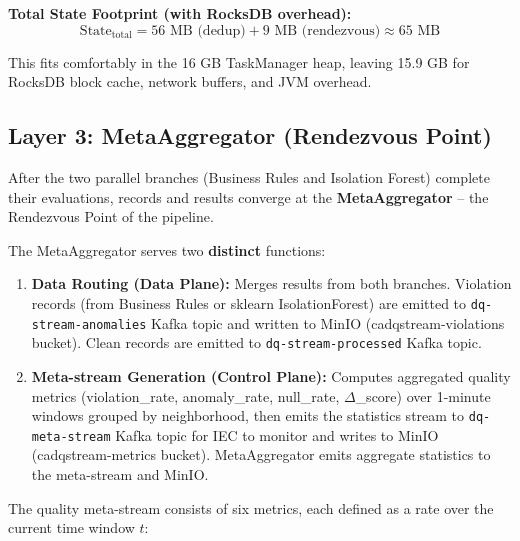 \textbf{Total State Footprint (with RocksDB overhead):}
\begin{equation}
\text{State}_{\text{total}} = 56 \text{ MB (dedup)} + 9 \text{ MB (rendezvous)} \approx 65 \text{ MB}
\end{equation}

This fits comfortably in the 16 GB TaskManager heap, leaving 15.9 GB for RocksDB block cache, network buffers, and JVM overhead.

\subsection{Layer 3: MetaAggregator (Rendezvous Point)}

After the two parallel branches (Business Rules and Isolation Forest) complete their evaluations, records and results converge at the \textbf{MetaAggregator} -- the Rendezvous Point of the pipeline.

The MetaAggregator serves two \textbf{distinct} functions:

\begin{enumerate}
    \item \textbf{Data Routing (Data Plane):} Merges results from both branches. Violation records (from Business Rules or sklearn IsolationForest) are emitted to \texttt{dq-stream-anomalies} Kafka topic and written to MinIO (cadqstream-violations bucket). Clean records are emitted to \texttt{dq-stream-processed} Kafka topic.

    \item \textbf{Meta-stream Generation (Control Plane):} Computes aggregated quality metrics (violation\_rate, anomaly\_rate, null\_rate, $\Delta$\_score) over 1-minute windows grouped by neighborhood, then emits the statistics stream to \texttt{dq-meta-stream} Kafka topic for IEC to monitor and writes to MinIO (cadqstream-metrics bucket). MetaAggregator emits aggregate statistics to the meta-stream and MinIO.
\end{enumerate}

The quality meta-stream consists of six metrics, each defined as a rate over the current time window $t$:

